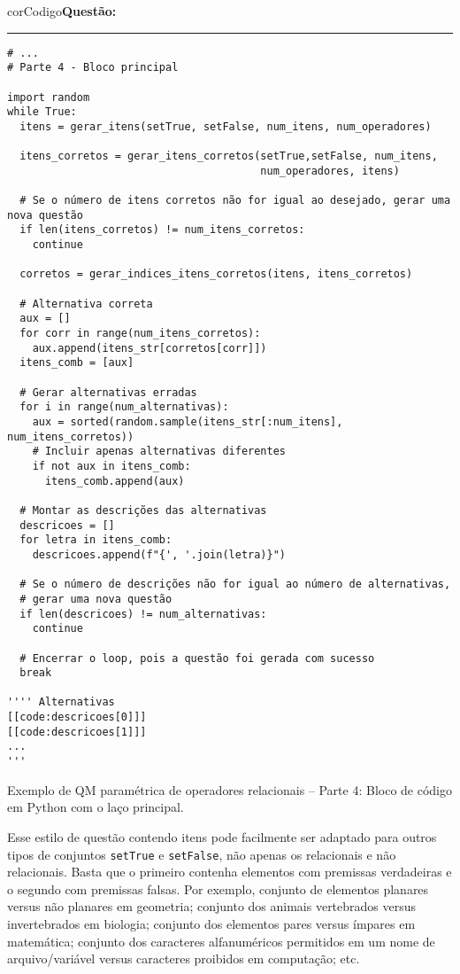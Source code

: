 \begin{listing}[!ht]
    \begin{myboxCode}{corCodigo}{\textbf{Questão: }}\vspace{3mm}
    \hrule
    \begin{verbatim}
# ...
# Parte 4 - Bloco principal

import random
while True:
  itens = gerar_itens(setTrue, setFalse, num_itens, num_operadores)

  itens_corretos = gerar_itens_corretos(setTrue,setFalse, num_itens, 
                                        num_operadores, itens)

  # Se o número de itens corretos não for igual ao desejado, gerar uma nova questão
  if len(itens_corretos) != num_itens_corretos:
    continue
  
  corretos = gerar_indices_itens_corretos(itens, itens_corretos)

  # Alternativa correta
  aux = []
  for corr in range(num_itens_corretos):
    aux.append(itens_str[corretos[corr]])
  itens_comb = [aux]

  # Gerar alternativas erradas
  for i in range(num_alternativas):
    aux = sorted(random.sample(itens_str[:num_itens], num_itens_corretos))
    # Incluir apenas alternativas diferentes
    if not aux in itens_comb:
      itens_comb.append(aux)

  # Montar as descrições das alternativas
  descricoes = []
  for letra in itens_comb:
    descricoes.append(f"{', '.join(letra)}") 

  # Se o número de descrições não for igual ao número de alternativas, 
  # gerar uma nova questão
  if len(descricoes) != num_alternativas:
    continue

  # Encerrar o loop, pois a questão foi gerada com sucesso
  break

'''' Alternativas
[[code:descricoes[0]]]
[[code:descricoes[1]]]
...
'''
\end{verbatim}
\end{myboxCode}
\caption{Exemplo de QM paramétrica de operadores relacionais -- Parte 4: Bloco de código em Python com o laço principal.}
\label{lst:questaoQM_Extra1_parte4}
\end{listing}


Esse estilo de questão contendo itens pode facilmente ser adaptado para outros tipos de conjuntos \verb|setTrue| e \verb|setFalse|, não apenas os relacionais e não relacionais. Basta que o primeiro contenha elementos com premissas verdadeiras e o segundo com premissas falsas. Por exemplo, conjunto de elementos planares versus não planares em geometria; conjunto dos animais vertebrados versus invertebrados em biologia; conjunto dos elementos pares versus ímpares em matemática; conjunto dos caracteres alfanuméricos permitidos em um nome de arquivo/variável versus caracteres proibidos em computação; etc.

